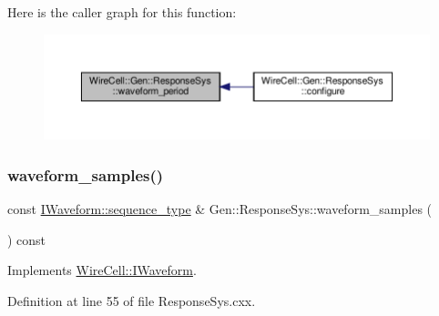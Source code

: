 Here is the caller graph for this function\+:
\nopagebreak
\begin{figure}[H]
\begin{center}
\leavevmode
\includegraphics[width=350pt]{class_wire_cell_1_1_gen_1_1_response_sys_ab6bced35ba8f8279d8204d842caf868a_icgraph}
\end{center}
\end{figure}
\mbox{\label{class_wire_cell_1_1_gen_1_1_response_sys_acfe9c4ac7194cd013c12168df9021005}} 
\subsubsection{\texorpdfstring{waveform\+\_\+samples()}{waveform\_samples()}}
{\footnotesize\ttfamily const \hyperlink{class_wire_cell_1_1_i_waveform_ad8f85e800ab8082ddbd89ac91164db7d}{I\+Waveform\+::sequence\+\_\+type} \& Gen\+::\+Response\+Sys\+::waveform\+\_\+samples (\begin{DoxyParamCaption}{ }\end{DoxyParamCaption}) const\hspace{0.3cm}{\ttfamily [virtual]}}



Implements \hyperlink{class_wire_cell_1_1_i_waveform_a4901f7f36170f22c3e89ebd7939be4d0}{Wire\+Cell\+::\+I\+Waveform}.



Definition at line 55 of file Response\+Sys.\+cxx.

\mbox{\label{class_wire_cell_1_1_gen_1_1_response_sys_a7b431ba8fb1668bd0b067f5f03b53171}} 
